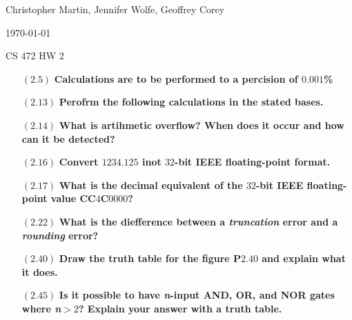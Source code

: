 \documentclass[letterpaper,10pt,titlepage]{article}
\def\name{Christopher Martin, Jennifer Wolfe, Geoffrey Corey}
\begin{document}
\hfill \name

\hfill \today

\hfill CS 472 HW 2

\begin{enumerate}
\item[$(2.5)$] \textbf{Calculations are to be performed to a percision of $0.001$\%}

    
\item[$(2.13)$] \textbf{Perofrm the following calculations in the stated bases.}

  
\item[$(2.14)$] \textbf{What is artihmetic overflow? When does it occur and how can it be detected?}
  
  
\item[$(2.16)$] \textbf{Convert $1234.125$ inot $32$-bit IEEE floating-point format.}
  
  
\item[$(2.17)$] \textbf{What is the decimal equivalent of the $32$-bit IEEE floating-point value CC$4$C$0000$?}


\item[$(2.22)$] \textbf{What is the diefference between a \textit{truncation} error and a \textit{rounding} error?}

  
\item[$(2.40)$] \textbf{Draw the truth table for the figure P$2.40$ and explain what it does.}

\item[$(2.45)$] \textbf{Is it possible to have \textit{n}-input  AND, OR, and NOR gates where \textit{n}$>2$? Explain your answer with a truth table.}


\end{enumerate}
\end{document}
